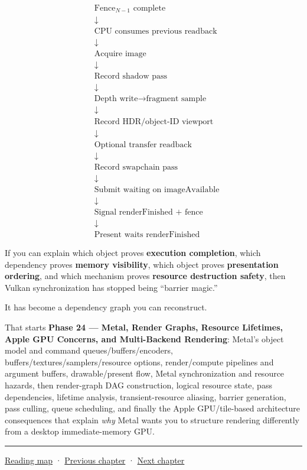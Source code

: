 \[
\boxed{
\begin{aligned}
&\text{Fence}_{N-1}\text{ complete}\\
&\downarrow\\
&\text{CPU consumes previous readback}\\
&\downarrow\\
&\text{Acquire image}\\
&\downarrow\\
&\text{Record shadow pass}\\
&\downarrow\\
&\text{Depth write}\rightarrow\text{fragment sample}\\
&\downarrow\\
&\text{Record HDR/object-ID viewport}\\
&\downarrow\\
&\text{Optional transfer readback}\\
&\downarrow\\
&\text{Record swapchain pass}\\
&\downarrow\\
&\text{Submit waiting on imageAvailable}\\
&\downarrow\\
&\text{Signal renderFinished + fence}\\
&\downarrow\\
&\text{Present waits renderFinished}
\end{aligned}
}
\]

If you can explain which object proves \textbf{execution completion}, which dependency proves \textbf{memory visibility}, which object proves \textbf{presentation ordering}, and which mechanism proves \textbf{resource destruction safety}, then Vulkan synchronization has stopped being ``barrier magic.''

It has become a dependency graph you can reconstruct.

That starts \textbf{Phase 24 --- Metal, Render Graphs, Resource Lifetimes, Apple GPU Concerns, and Multi-Backend Rendering}: Metal's object model and command queues/buffers/encoders, buffers/textures/samplers/resource options, render/compute pipelines and argument buffers, drawable/present flow, Metal synchronization and resource hazards, then render-graph DAG construction, logical resource state, pass dependencies, lifetime analysis, transient-resource aliasing, barrier generation, pass culling, queue scheduling, and finally the Apple GPU/tile-based architecture consequences that explain \emph{why} Metal wants you to structure rendering differently from a desktop immediate-memory GPU.

\begin{center}\rule{0.5\linewidth}{0.5pt}\end{center}

\hyperref[volume-reading-map]{Reading map} · \hyperref[01-foundations-i-ch013-open-vulkan-devices-and-describe-resources]{Previous chapter} · \hyperref[01-foundations-i-ch015-execute-and-measure-a-metal-frame]{Next chapter}
